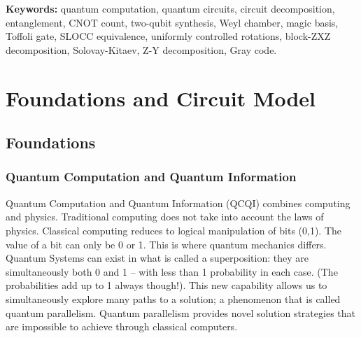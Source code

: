 \documentclass[12pt, a4paper, oneside]{report}
\theoremstyle{plain}
\theoremstyle{definition}
\theoremstyle{remark}
\begin{document}
\vspace{1em}
\noindent\textbf{Keywords:} quantum computation, quantum circuits, circuit decomposition, entanglement, CNOT count, two-qubit synthesis, Weyl chamber, magic basis, Toffoli gate, SLOCC equivalence, uniformly controlled rotations, block-ZXZ decomposition, Solovay-Kitaev, Z-Y decomposition, Gray code.

\clearpage
\tableofcontents

\clearpage
\listoftables
{}

\clearpage
{}
\setcounter{page}{1}

\part{Foundations and Circuit Model}

\chapter{Foundations}
\label{ch:foundations}

\section{Quantum Computation and Quantum Information}

Quantum Computation and Quantum Information (QCQI) combines computing and physics. Traditional computing does not take into account the laws of physics. Classical computing reduces to logical manipulation of bits (0,1). The value of a bit can only be 0 or 1. This is where quantum mechanics differs. Quantum Systems can exist in what is called a superposition: they are simultaneously both 0 and 1 -- with less than 1 probability in each case. (The probabilities add up to 1 always though!). This new capability allows us to simultaneously explore many paths to a solution; a phenomenon that is called quantum parallelism. Quantum parallelism provides novel solution strategies that are impossible to achieve through classical computers.
\end{document}
